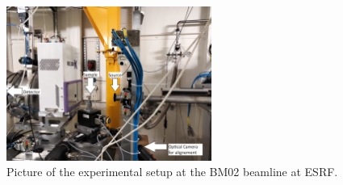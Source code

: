 \begin{figure}[h]
\centering
\includegraphics[width=0.6\textwidth]{images/photo_exp.jpg}
\caption{Picture of the experimental setup at the BM02 beamline at ESRF.}
\label{fig:exp_setup_real}
\end{figure}%
